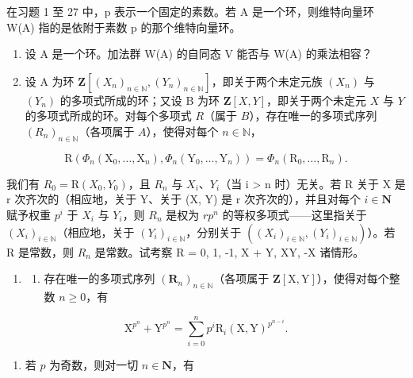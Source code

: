 
在习题 1 至 27 中，p 表示一个固定的素数。若 A 是一个环，则维特向量环 W(A) 指的是依附于素数 p 的那个维特向量环。

\begin{enumerate}
\def\labelenumi{\arabic{enumi})}
\item
  设 A 是一个环。加法群 W(A) 的自同态 V 能否与 W(A) 的乘法相容？
\item
  设 A 为环 \(\mathbf{Z}[(X_n)_{n\in\mathbb{N}}, (Y_n)_{n\in\mathbb{N}}]\)，即关于两个未定元族 \((X_n)\) 与 \((Y_n)\) 的多项式所成的环；又设 B 为环 \(\mathbf{Z}[X, Y]\)，即关于两个未定元 \(X\) 与 \(Y\) 的多项式所成的环。对每个多项式 \(R\)（属于 \(B\)），存在唯一的多项式序列 \((R_n)_{n\in\mathbb{N}}\)（各项属于 \(A\)），使得对每个 \(n\in\mathbb{N}\)，
\end{enumerate}

\[
\mathrm{R} \left(\Phi_ {n} \left(\mathrm{X} _ {0}, \dots , \mathrm{X} _ {n}\right), \Phi_ {n} \left(\mathrm{Y} _ {0}, \dots , \mathrm{Y} _ {n}\right)\right) = \Phi_ {n} \left(\mathrm{R} _ {0}, \dots , \mathrm{R} _ {n}\right).
\]

我们有 \(R_{0} = \mathrm{R}(X_{0}, Y_{0})\)，且 \(R_{n}\) 与 \(X_{i}\)、\(Y_{i}\)（当 i \textgreater{} n 时）无关。若 R 关于 X 是 r 次齐次的（相应地，关于 Y、关于 (X, Y) 是 r 次齐次的），并且对每个 \(i \in \mathbf{N}\) 赋予权重 \(p^{i}\) 于 \(X_{i}\) 与 \(Y_{i}\)，则 \(R_{n}\) 是权为 \(rp^{n}\) 的等权多项式——这里指关于 \((X_{i})_{i \in \mathbb{N}}\)（相应地，关于 \((Y_{i})_{i \in \mathbb{N}}\)，分别关于 \(((X_{i})_{i \in \mathbb{N}}, (Y_{i})_{i \in \mathbb{N}})\)）。若 R 是常数，则 \(R_{n}\) 是常数。试考察 R = 0, 1, -1, X + Y, XY, -X 诸情形。

\begin{enumerate}
\def\labelenumi{\arabic{enumi})}
\setcounter{enumi}{2}
\tightlist
\item
  \begin{enumerate}
  \def\labelenumii{\alph{enumii})}
  \tightlist
  \item
    存在唯一的多项式序列 \((\mathbf{R}_n)_{n\in \mathbb{N}}\)（各项属于 \(\mathbf{Z}[\mathrm{X},\mathrm{Y}]\)），使得对每个整数 \(n\geqslant 0\)，有
  \end{enumerate}
\end{enumerate}

\[
\mathrm{X} ^ {p ^ {n}} + \mathrm{Y} ^ {p ^ {n}} = \sum_ {i = 0} ^ {n} p ^ {i} \mathrm{R} _ {i} (\mathrm{X}, \mathrm{Y}) ^ {p ^ {n - i}}.
\]

\begin{enumerate}
\def\labelenumi{\alph{enumi})}
\setcounter{enumi}{1}
\tightlist
\item
  若 \(p\) 为奇数，则对一切 \(n \in \mathbf{N}\)，有
\end{enumerate}

